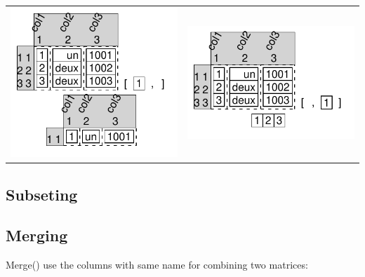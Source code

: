 \documentclass[pdflatex]{article}
\begin{document}
\begin{tabular}{cc}
\includegraphics{dataframe_extracting_row.pdf} & \includegraphics{dataframe_extracting_column.pdf}
\end{tabular}

\subsection{Subseting}


\subsection{Merging}

Merge() use the columns with same name for combining two matrices:
\end{document}

